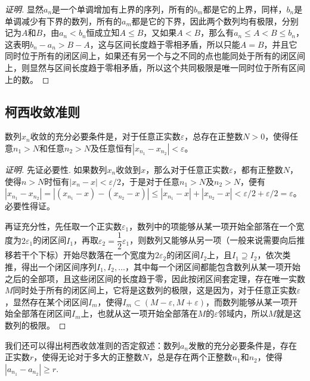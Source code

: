 \begin{proof}[证明]
  显然$a_n$是一个单调增加有上界的序列，所有的$b_m$都是它的上界，同样，$b_n$是单调减少有下界的数列，所有的$a_m$都是它的下界，因此两个数列均有极限，分别记为$A$和$B$，由$a_n < b_n$恒成立知$A \leqslant B$，又如果$A<B$，那么有$a_n\leqslant A < B \leqslant b_n$，这表明$b_n-a_n>B-A$，这与区间长度趋于零相矛盾，所以只能$A=B$，并且它同时位于所有的闭区间上，如果还有另一个与之不同的点也能同处于所有的闭区间上，则显然与区间长度趋于零相矛盾，所以这个共同极限是唯一同时位于所有区间上的数。
\end{proof}

\subsection{柯西收敛准则}
\label{sec:cauchy-convergence-rule}

\begin{theorem}[柯西收敛准则]
  数列$x_n$收敛的充分必要条件是，对于任意正实数$\varepsilon$，总存在正整数$N>0$，使得任意$n_1>N$和任意$n_2>N$及任意恒有$|x_{n_1}-x_{n_2}| < \varepsilon$。
\end{theorem}

\begin{proof}[证明]
  先证必要性. 如果数列$x_n$收敛到$x$，那么对于任意正实数$\varepsilon$，都有正整数$N$，使得$n>N$时恒有$|x_n-x|<\varepsilon / 2$，于是对于任意$n_1>N$及$n_2>N$，便有$|x_{n_1}-x_{n_2}|=|(x_{n_1}-x)- (x_{n_2}-x)|\leqslant |x_{n_1}-x|+|x_{n_2}-x|<\varepsilon / 2+\varepsilon / 2 = \varepsilon$。必要性得证。

  再证充分性，先任取一个正实数$\varepsilon_1$，数列中的项能够从某一项开始全部落在一个宽度为$2\varepsilon_1$的闭区间$I_1$，再取$\varepsilon_2 = \dfrac{1}{2}\varepsilon_1$，则数列又能够从另一项（一般来说需要向后推移若干个下标）开始尽数落在一个宽度为$2\varepsilon_2$的闭区间$I_2$上，且$I_1 \supseteq I_2$，依次类推，得出一个闭区间序列$I_1,I_2,\ldots$，其中每一个闭区间都能包含数列从某一项开始之后的全部项，且这些闭区间的长度趋于零，因此按闭区间套定理，存在唯一实数$M$同时处于所有的闭区间上，它将是这数列的极限，这是因为，对于任意正实数$\varepsilon$，显然存在某个闭区间$I_m$，使得$I_m \subset (M-\varepsilon,M+\varepsilon)$，而数列能够从某一项开始全部落在闭区间$I_m$上，也就从这一项开始全部落在$M$的$\varepsilon$邻域内，所以$M$就是这数列的极限。
\end{proof}

我们还可以得出柯西收敛准则的否定叙述：数列$a_n$发散的充分必要条件是，存在正实数$r$，使得无论对于多大的正整数$N$，总是存在两个正整数$n_1$和$n_2$，使得$|a_{n_1}-a_{n_2}| \geqslant r$.

